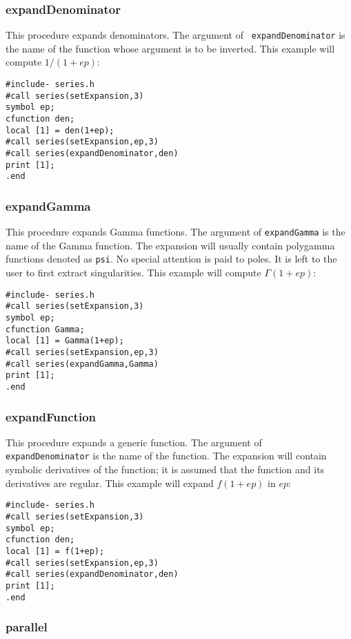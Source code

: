 \documentclass[titlepage]{article}
\begin{document}
\subsubsection{expandDenominator}
\label{sec:inv_fun}

This procedure expands denominators. The argument of {\tt
expandDenominator} is the name of the function whose argument is to be
inverted. This example will compute $1/(1+ep)$:
\begin{lstlisting}
#include- series.h
#call series(setExpansion,3)
symbol ep;
cfunction den;
local [1] = den(1+ep);
#call series(setExpansion,ep,3)
#call series(expandDenominator,den)
print [1];
.end
\end{lstlisting}

\subsubsection{expandGamma}
\label{sec:exp_Gamma}

This procedure expands Gamma functions. The argument of {\tt expandGamma} is
the name of the Gamma function. The expansion will usually contain polygamma
functions denoted as {\tt psi}. No special attention is paid to
poles. It is left to the user to first extract singularities.
This example will compute $\Gamma(1+ep)$:
\begin{lstlisting}
#include- series.h
#call series(setExpansion,3)
symbol ep;
cfunction Gamma;
local [1] = Gamma(1+ep);
#call series(setExpansion,ep,3)
#call series(expandGamma,Gamma)
print [1];
.end
\end{lstlisting}

\subsubsection{expandFunction}
\label{sec:inv_fun}

This procedure expands a generic function. The argument of {\tt
expandDenominator} is the name of the function. The expansion will
contain symbolic derivatives of the function; it is assumed that the
function and its derivatives are regular.
This example will expand $f(1+ep)$ in $ep$:
\begin{lstlisting}
#include- series.h
#call series(setExpansion,3)
symbol ep;
cfunction den;
local [1] = f(1+ep);
#call series(setExpansion,ep,3)
#call series(expandDenominator,den)
print [1];
.end
\end{lstlisting}

\subsubsection{parallel}
\label{sec:parallel}
\end{document}

